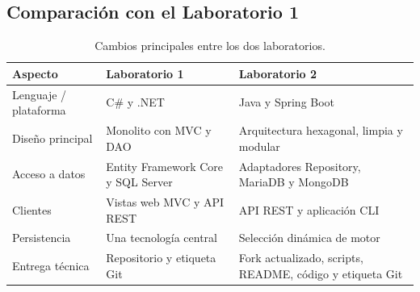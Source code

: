 \documentclass[11pt,a4paper]{article}
\begin{document}
\subsection{Comparación con el Laboratorio 1}
\begin{table}[H]
\centering\small
\begin{tabularx}{\textwidth}{@{}p{3.1cm}XX@{}}
\toprule
\textbf{Aspecto}&\textbf{Laboratorio 1}&\textbf{Laboratorio 2}\\\midrule
Lenguaje / plataforma& C\# y .NET& Java y Spring Boot\\
Diseño principal& Monolito con MVC y DAO& Arquitectura hexagonal, limpia y modular\\
Acceso a datos& Entity Framework Core y SQL Server& Adaptadores Repository, MariaDB y MongoDB\\
Clientes& Vistas web MVC y API REST& API REST y aplicación CLI\\
Persistencia& Una tecnología central& Selección dinámica de motor\\
Entrega técnica& Repositorio y etiqueta Git& Fork actualizado, scripts, README, código y etiqueta Git\\
\bottomrule
\end{tabularx}
\caption{Cambios principales entre los dos laboratorios.}
\end{table}
\end{document}
